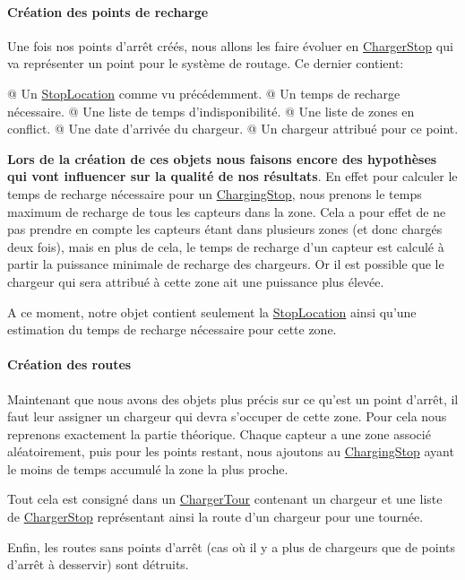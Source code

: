 \documentclass[final]{polytech/polytech}
\newcommand{\klass}[1]{\hyperref[class:#1]{#1}}
\begin{document}
				\paragraph{Création des points de recharge}
					Une fois nos points d'arrêt créés, nous allons les faire évoluer en \klass{ChargerStop} qui va représenter un point pour le système de routage.
					Ce dernier contient:
					\begin{easylist}
						@ Un \klass{StopLocation} comme vu précédemment.
						@ Un temps de recharge nécessaire.
						@ Une liste de temps d'indisponibilité.
						@ Une liste de zones en conflict.
						@ Une date d'arrivée du chargeur.
						@ Un chargeur attribué pour ce point.
					\end{easylist}
					
					\textbf{Lors de la création de ces objets nous faisons encore des hypothèses qui vont influencer sur la qualité de nos résultats}.
					En effet pour calculer le temps de recharge nécessaire pour un \klass{ChargingStop}, nous prenons le temps maximum de recharge de tous les capteurs dans la zone.
					Cela a pour effet de ne pas prendre en compte les capteurs étant dans plusieurs zones (et donc chargés deux fois), mais en plus de cela, le temps de recharge d'un capteur est calculé à partir la puissance minimale de recharge des chargeurs.
					Or il est possible que le chargeur qui sera attribué à cette zone ait une puissance plus élevée.
					
					A ce moment, notre objet contient seulement la \klass{StopLocation} ainsi qu'une estimation du temps de recharge nécessaire pour cette zone.
					
				\paragraph{Création des routes}
					Maintenant que nous avons des objets plus précis sur ce qu'est un point d'arrêt, il faut leur assigner un chargeur qui devra s'occuper de cette zone.
					Pour cela nous reprenons exactement la partie théorique.
					Chaque capteur a une zone associé aléatoirement, puis pour les points restant, nous ajoutons au \klass{ChargingStop} ayant le moins de temps accumulé la zone la plus proche.
					
					Tout cela est consigné dans un \klass{ChargerTour} contenant un chargeur et une liste de \klass{ChargerStop} représentant ainsi la route d'un chargeur pour une tournée.
					
					Enfin, les routes sans points d'arrêt (cas où il y a plus de chargeurs que de points d'arrêt à desservir) sont détruits.
					
\end{document}
